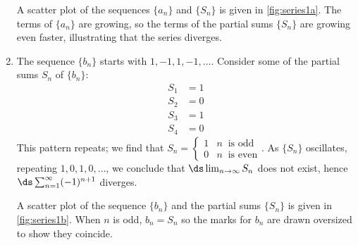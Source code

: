 \begin{example}
\begin{enumerate}
A scatter plot of the sequences $\{a_n\}$ and $\{S_n\}$ is given in \autoref{fig:series1a}. The terms of $\{a_n\}$ are growing, so the terms of the partial sums $\{S_n\}$ are growing even faster, illustrating that the series diverges.

\item	The sequence $\{b_n\}$ starts with $1, -1, 1, -1, \dotsc$. Consider some of the partial sums $S_n$ of $\{b_n\}$:
\begin{align*}
S_1 &= 1\\
S_2 &= 0\\
S_3 &= 1\\
S_4 &= 0
\end{align*}
This pattern repeats; we find that
$S_n = \begin{cases}
1  & n\ \text{ is odd}\\
0  & n\ \text{ is even}
\end{cases}$.\smallskip
As $\{S_n\}$ oscillates, repeating $1, 0, 1, 0, \dotsc$, we conclude that $\ds\lim_{n\to\infty}S_n$ does not exist, hence $\ds\sum_{n=1}^\infty (-1)^{n+1}$ diverges.		


A scatter plot of the sequence $\{b_n\}$ and the partial sums $\{S_n\}$ is given in \autoref{fig:series1b}. When $n$ is odd, $b_n = S_n$ so the marks for $b_n$ are drawn oversized to show they coincide.
\end{enumerate}
\end{example}

